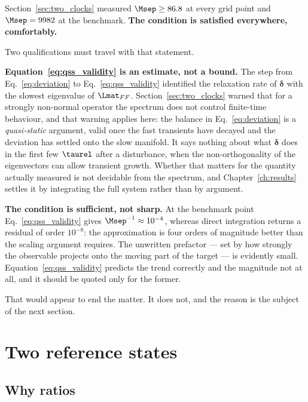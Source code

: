 Section~\ref{sec:two_clocks} measured $\Msep \ge 86.8$ at every grid point and
$\Msep = 9982$ at the benchmark. \textbf{The condition is satisfied everywhere,
comfortably.}

Two qualifications must travel with that statement.

\textbf{Equation~\eqref{eq:qss_validity} is an estimate, not a bound.} The step
from Eq.~\eqref{eq:deviation} to Eq.~\eqref{eq:qss_validity} identified the
relaxation rate of $\bm{\delta}$ with the slowest eigenvalue of $\Lmat_{FF}$.
Section~\ref{sec:two_clocks} warned that for a strongly non-normal operator the
spectrum does not control finite-time behaviour, and that warning applies here:
the balance in Eq.~\eqref{eq:deviation} is a \emph{quasi-static} argument, valid
once the fast transients have decayed and the deviation has settled onto the
slow manifold. It says nothing about what $\bm{\delta}$ does in the first few
$\taurel$ after a disturbance, when the non-orthogonality of the eigenvectors
can allow transient growth. Whether that matters for the quantity actually
measured is not decidable from the spectrum, and Chapter~\ref{ch:results}
settles it by integrating the full system rather than by argument.

\textbf{The condition is sufficient, not sharp.} At the benchmark point
Eq.~\eqref{eq:qss_validity} gives $\Msep^{-1} \approx 10^{-4}$, whereas direct
integration returns a residual of order $10^{-8}$: the approximation is four
orders of magnitude better than the scaling argument requires. The unwritten
prefactor --- set by how strongly the observable projects onto the moving part of
the target --- is evidently small. Equation~\eqref{eq:qss_validity} predicts the
trend correctly and the magnitude not at all, and it should be quoted only for
the former.

That would appear to end the matter. It does not, and the reason is the subject
of the next section.

\section{Two reference states}
\label{sec:two_references}

\subsection{Why ratios}

